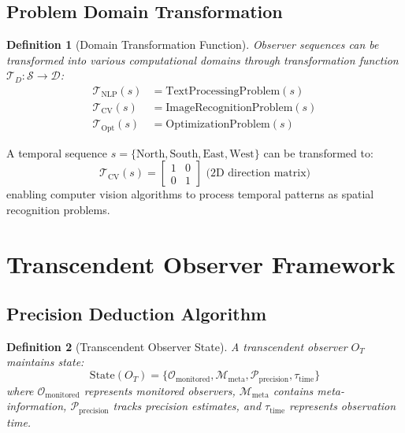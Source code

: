 \documentclass[12pt,a4paper]{article}
\newtheorem{definition}{Definition}
\begin{document}
\subsection{Problem Domain Transformation}

\begin{definition}[Domain Transformation Function]
Observer sequences can be transformed into various computational domains through transformation function $\mathcal{T}_D: \mathcal{S} \to \mathcal{D}$:
\begin{align}
\mathcal{T}_{\text{NLP}}(s) &= \text{TextProcessingProblem}(s) \\
\mathcal{T}_{\text{CV}}(s) &= \text{ImageRecognitionProblem}(s) \\
\mathcal{T}_{\text{Opt}}(s) &= \text{OptimizationProblem}(s)
\end{align}
\end{definition}

\begin{example}
A temporal sequence $s = \{\text{North}, \text{South}, \text{East}, \text{West}\}$ can be transformed to:
\begin{equation}
\mathcal{T}_{\text{CV}}(s) = \begin{bmatrix}
1 & 0 \\
0 & 1
\end{bmatrix} \text{ (2D direction matrix)}
\end{equation}
enabling computer vision algorithms to process temporal patterns as spatial recognition problems.
\end{example}

\section{Transcendent Observer Framework}

\subsection{Precision Deduction Algorithm}

\begin{definition}[Transcendent Observer State]
A transcendent observer $O_T$ maintains state:
\begin{equation}
\text{State}(O_T) = \{\mathcal{O}_{\text{monitored}}, \mathcal{M}_{\text{meta}}, \mathcal{P}_{\text{precision}}, \tau_{\text{time}}\}
\end{equation}
where $\mathcal{O}_{\text{monitored}}$ represents monitored observers, $\mathcal{M}_{\text{meta}}$ contains meta-information, $\mathcal{P}_{\text{precision}}$ tracks precision estimates, and $\tau_{\text{time}}$ represents observation time.
\end{definition}
\end{document}
